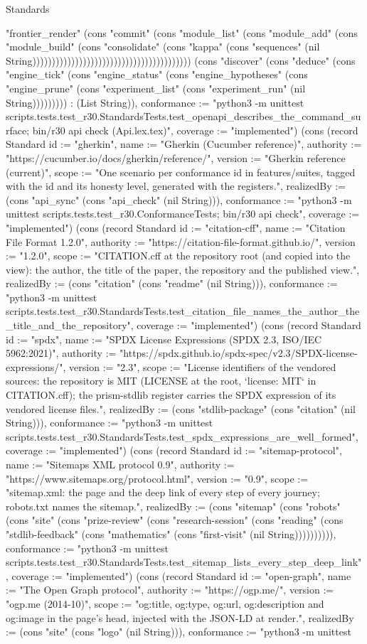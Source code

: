 \begin{lexlean}{Standards}
\begin{semanticmodule}
{"frontier_render" (cons "commit" (cons "module_list" (cons "module_add" (cons "module_build" (cons "consolidate" (cons "kappa" (cons "sequences" (nil String))))))))))))))))))))))))))))))))))))))))) (cons "discover" (cons "deduce" (cons "engine_tick" (cons "engine_status" (cons "engine_hypotheses" (cons "engine_prune" (cons "experiment_list" (cons "experiment_run" (nil String))))))))) : (List String)), conformance := "python3 -m unittest scripts.tests.test_r30.StandardsTests.test_openapi_describes_the_command_surface; bin/r30 api check (Api.lex.tex)", coverage := "implemented"}) (cons (record Standard {id := "gherkin", name := "Gherkin (Cucumber reference)", authority := "https://cucumber.io/docs/gherkin/reference/", version := "Gherkin reference (current)", scope := "One scenario per conformance id in features/suites, tagged with the id and its honesty level, generated with the registers.", realizedBy := (cons "api_sync" (cons "api_check" (nil String))), conformance := "python3 -m unittest scripts.tests.test_r30.ConformanceTests; bin/r30 api check", coverage := "implemented"}) (cons (record Standard {id := "citation-cff", name := "Citation File Format 1.2.0", authority := "https://citation-file-format.github.io/", version := "1.2.0", scope := "CITATION.cff at the repository root (and copied into the view): the author, the title of the paper, the repository and the published view.", realizedBy := (cons "citation" (cons "readme" (nil String))), conformance := "python3 -m unittest scripts.tests.test_r30.StandardsTests.test_citation_file_names_the_author_the_title_and_the_repository", coverage := "implemented"}) (cons (record Standard {id := "spdx", name := "SPDX License Expressions (SPDX 2.3, ISO/IEC 5962:2021)", authority := "https://spdx.github.io/spdx-spec/v2.3/SPDX-license-expressions/", version := "2.3", scope := "License identifiers of the vendored sources: the repository is MIT (LICENSE at the root, `license: MIT` in CITATION.cff); the prism-stdlib register carries the SPDX expression of its vendored license files.", realizedBy := (cons "stdlib-package" (cons "citation" (nil String))), conformance := "python3 -m unittest scripts.tests.test_r30.StandardsTests.test_spdx_expressions_are_well_formed", coverage := "implemented"}) (cons (record Standard {id := "sitemap-protocol", name := "Sitemaps XML protocol 0.9", authority := "https://www.sitemaps.org/protocol.html", version := "0.9", scope := "sitemap.xml: the page and the deep link of every step of every journey; robots.txt names the sitemap.", realizedBy := (cons "sitemap" (cons "robots" (cons "site" (cons "prize-review" (cons "research-session" (cons "reading" (cons "stdlib-feedback" (cons "mathematics" (cons "first-visit" (nil String)))))))))), conformance := "python3 -m unittest scripts.tests.test_r30.StandardsTests.test_sitemap_lists_every_step_deep_link", coverage := "implemented"}) (cons (record Standard {id := "open-graph", name := "The Open Graph protocol", authority := "https://ogp.me/", version := "ogp.me (2014-10)", scope := "og:title, og:type, og:url, og:description and og:image in the page's head, injected with the JSON-LD at render.", realizedBy := (cons "site" (cons "logo" (nil String))), conformance := "python3 -m unittest }
\end{semanticmodule}
\end{lexlean}
